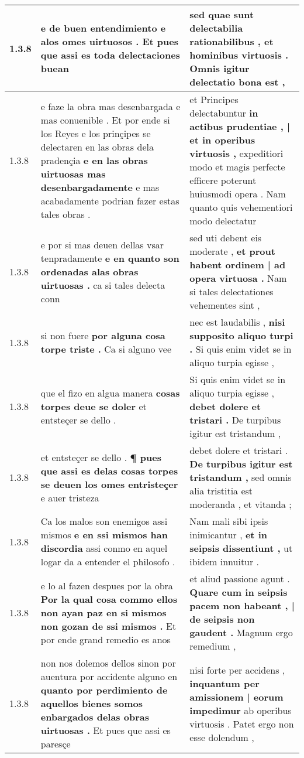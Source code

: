 \begin{tabular}{|p{1cm}|p{6.5cm}|p{6.5cm}|}
1.3.8 & e de buen entendimiento \textbf{ e alos omes uirtuosos . } Et pues que assi es toda delectaciones buean & sed quae sunt delectabilia rationabilibus , \textbf{ et hominibus virtuosis . } Omnis igitur delectatio bona est , \\\hline
1.3.8 & e faze la obra mas desenbargada e mas conuenible . Et por ende si los Reyes e los prinçipes se delectaren en las obras dela pradençia \textbf{ e en las obras uirtuosas mas desenbargadamente } e mas acabadamente podrian fazer estas tales obras . & et Principes delectabuntur \textbf{ in actibus prudentiae , | et in operibus virtuosis , } expeditiori modo et magis perfecte efficere poterunt huiusmodi opera . Nam quanto quis vehementiori modo delectatur \\\hline
1.3.8 & e por si mas deuen dellas vsar tenpradamente \textbf{ e en quanto son ordenadas alas obras uirtuosas . } ca si tales delecta conn & sed uti debent eis moderate , \textbf{ et prout habent ordinem | ad opera virtuosa . } Nam si tales delectationes vehementes sint , \\\hline
1.3.8 & si non fuere \textbf{ por alguna cosa torpe triste . } Ca si alguno vee & nec est laudabilis , \textbf{ nisi supposito aliquo turpi . } Si quis enim videt se in aliquo turpia egisse , \\\hline
1.3.8 & que el fizo en algua manera \textbf{ cosas torpes deue se doler } et entsteçer se dello . & Si quis enim videt se in aliquo turpia egisse , \textbf{ debet dolere et tristari . } De turpibus igitur est tristandum , \\\hline
1.3.8 & et entsteçer se dello . \textbf{ ¶ pues que assi es delas cosas torpes se deuen los omes entristeçer } e auer tristeza & debet dolere et tristari . \textbf{ De turpibus igitur est tristandum , } sed omnis alia tristitia est moderanda , et vitanda ; \\\hline
1.3.8 & Ca los malos son enemigos assi mismos \textbf{ e en ssi mismos han discordia } assi conmo en aquel logar da a entender el philosofo . & Nam mali sibi ipsis inimicantur , \textbf{ et in seipsis dissentiunt , } ut ibidem innuitur . \\\hline
1.3.8 & e lo al fazen despues por la obra \textbf{ Por la qual cosa commo ellos non ayan paz en si mismos non gozan de ssi mismos . } Et por ende grand remedio es anos & et aliud passione agunt . \textbf{ Quare cum in seipsis pacem non habeant , | de seipsis non gaudent . } Magnum ergo remedium , \\\hline
1.3.8 & non nos dolemos dellos sinon por auentura por accidente alguno en \textbf{ quanto por perdimiento de aquellos bienes somos enbargados delas obras uirtuosas . } Et pues que assi es paresçe & nisi forte per accidens , \textbf{ inquantum per amissionem | eorum impedimur } ab operibus virtuosis . Patet ergo non esse dolendum , \\\hline

\end{tabular}
